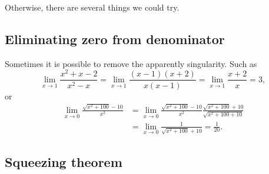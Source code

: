\documentclass[letter-paper]{tufte-book}
\begin{document}
Otherwise, there are several things we could try.

\subsection{Eliminating zero from denominator}

Sometimes it is possible to remove the apparently singularity. Such as
\begin{equation*}
  \lim_{x\rightarrow 1}\frac{x^2+x-2}{x^2-x}
  =\lim_{x\rightarrow 1}\frac{(x-1)(x+2)}{x(x-1)}
  =\lim_{x\rightarrow 1}\frac{x+2}{x}=3,
\end{equation*}
or
\begin{align*}
  \lim_{x\rightarrow 0}\frac{\sqrt{x^2+100}-10}{x^2} &= \lim_{x\rightarrow 0}\frac{\sqrt{x^2+100}-10}{x^2} \frac{\sqrt{x^2+100}+10}{\sqrt{x^2+100+10}}\\
  &= \lim_{x\rightarrow 0}\frac{1}{\sqrt{x^2+100}+10}=\frac{1}{20}.
\end{align*}

\subsection{Squeezing theorem}
\end{document}
